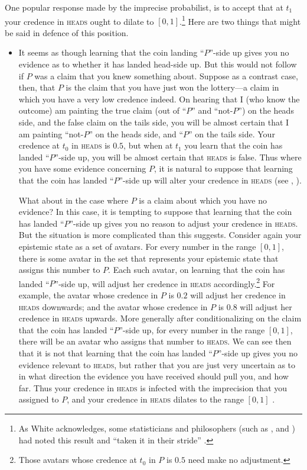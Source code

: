 One popular response made by the imprecise probabilist, is to accept that at $t_1$ your credence in \textsc{heads} ought to dilate to $[0,1]$.\footnote{As White acknowledges, some statisticians and philosophers (such as \citealp{walley1991}, and \citealp{seidenfeldwasserman1993}) had noted this result and ``taken it in their stride'' \citep[p. 177]{White2009}.} Here are two things that might be said in defence of this position. 

\begin{itemize}
  \item It seems as though learning that the coin landing ``$P$''-side up gives you no evidence as to whether it has landed head-side up. But this would not follow if $P$ was a claim that you knew something about. Suppose as a contrast case, then, that $P$ is the claim that you have just won the lottery---a claim in which you have a very low credence indeed. On hearing that I (who know the outcome) am painting the true claim (out of ``$P$'' and ``not-$P$'') on the heads side, and the false claim on the tails side, you will be almost certain that I am painting ``not-$P$'' on the heads side, and ``$P$'' on the tails side. Your credence at $t_0$ in \textsc{heads} is $0.5$, but when at $t_1$ you learn that the coin has landed ``$P$''-side up, you will be almost certain that \textsc{heads} is false. Thus where you have some evidence concerning $P$, it is natural to suppose that learning that the coin has landed ``$P$''-side up will alter your credence in \textsc{heads} (see \citealp{sturgeon2010}, \citealp{Joyce2010}). 

What about in the case where $P$ is a claim about which you have no evidence? In this case, it is tempting to suppose that learning that the coin has landed ``$P$''-side up gives you no reason to adjust your credence in \textsc{heads}. But the situation is more complicated than this suggests. Consider again your epistemic state as a set of avatars. For every number in the range $[0,1]$, there is some avatar in the set that represents your epistemic state that assigns this number to $P$. Each such avatar, on learning that the coin has landed ``$P$''-side up, will adjust her credence in \textsc{heads} accordingly.\footnote{Those avatars whose credence at $t_0$ in $P$ is $0.5$ need make no adjustment.}  For example, the avatar whose credence in $P$ is $0.2$ will adjust her credence in \textsc{heads} downwards; and the avatar whose credence in $P$ is $0.8$ will adjust her credence in \textsc{heads} upwards. More generally after conditionalizing on the claim that the coin has landed ``$P$''-side up, for every number in the range $[0,1]$, there will be an avatar who assigns that number to \textsc{heads}. We can see then that it is not that learning that the coin has landed ``$P$''-side up gives you no evidence relevant to \textsc{heads}, but rather that you are just very uncertain as to in what direction the evidence you have received should pull you, and how far. Thus your credence in \textsc{heads} is infected with the imprecision that you assigned to $P$, and your credence in \textsc{heads} dilates to the range $[0,1]$ \citep{Joyce2010}.


\end{itemize}
